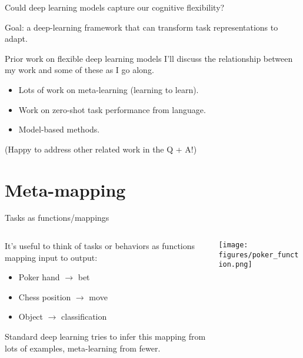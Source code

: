 \documentclass{beamer}
\begin{document}
\begin{frame}[standout]
Could deep learning models capture our cognitive flexibility?
\end{frame}


\begin{frame}[standout]
Goal: a deep-learning framework that can transform task representations to adapt.
\end{frame}



\begin{frame}{Prior work on flexible deep learning models}
I'll discuss the relationship between my work and some of these as I go along.
\begin{itemize}
    \item Lots of work on meta-learning (learning to learn).
    \item Work on zero-shot task performance from language.
    \item Model-based methods. 
\end{itemize}
(Happy to address other related work in the Q + A!)
\end{frame}

\section{Meta-mapping}

\begin{frame}{Tasks as functions/mappings}
\begin{columns}
\begin{column}{0.5\textwidth}
It's useful to think of tasks or behaviors as functions mapping input to output:
\begin{itemize}
    \item Poker hand \(\rightarrow\) bet
    \item Chess position \(\rightarrow\) move
    \item Object \(\rightarrow\) classification
\end{itemize}
Standard deep learning tries to infer this mapping from lots of examples, meta-learning from fewer. 
\end{column}

\begin{column}{0.5\textwidth}
\texttt{[image: figures/poker\_function.png]}
\end{column}
\end{columns}
\end{frame}
\end{document}
